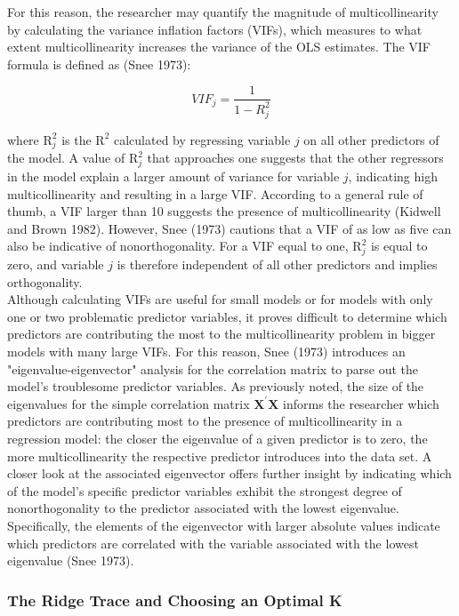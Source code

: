 \noindent For this reason, the researcher may quantify the magnitude of multicollinearity by calculating the variance inflation factors (VIFs), which measures to what extent multicollinearity increases the variance of the OLS estimates. The VIF formula is defined as (Snee 1973):  

$$
VIF_{j}=\frac{1}{1-R_{j}^{2}}
$$

\noindent where $ \mathrm R_{j}^2$ is the $ \mathrm R^2$ calculated by regressing variable $j$ on all other predictors of the model. A value of $ \mathrm R_{j}^2$ that approaches one suggests that the other regressors in the model explain a larger amount of variance for variable $j$, indicating high multicollinearity and resulting in a large VIF. According to a general rule of thumb, a VIF larger than 10 suggests the presence of multicollinearity (Kidwell and Brown 1982). However, Snee (1973) cautions that a VIF of as low as five can also be indicative of nonorthogonality. For a VIF equal to one, $ \mathrm R_{j}^2$ is equal to zero, and variable $j$ is therefore independent of all other predictors and implies orthogonality. \\

\noindent Although calculating VIFs are useful for small models or for models with only one or two problematic predictor variables, it proves difficult to determine which predictors are contributing the most to the multicollinearity problem in bigger models with many large VIFs. For this reason, Snee (1973) introduces an "eigenvalue-eigenvector" analysis for the correlation matrix to parse out the model's troublesome predictor variables. As previously noted, the size of the eigenvalues for the simple correlation matrix $\mathbf X^{\prime} \mathbf X$ informs the researcher which predictors are contributing most to the presence of multicollinearity in a regression model: the closer the eigenvalue of a given predictor is to zero, the more multicollinearity the respective predictor introduces into the data set. A closer look at the associated eigenvector offers further insight by indicating which of the model's specific predictor variables exhibit the strongest degree of nonorthogonality to the predictor associated with the lowest eigenvalue. Specifically, the elements of the eigenvector with larger absolute values indicate which predictors are correlated with the variable associated with the lowest eigenvalue (Snee 1973).

\subsubsection{The Ridge Trace and Choosing an Optimal K}


